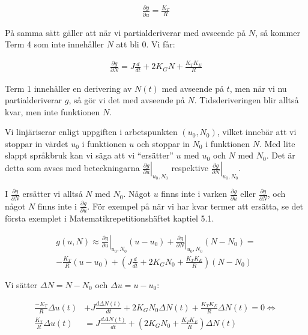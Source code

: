 \documentclass[a4paper]{article}
\begin{document}
\begin{align*}
  \frac{\partial g}{\partial u} = \frac{K_T}{R}
\end{align*}

På samma sätt gäller att när vi partialderiverar med avseende på $N$, så kommer Term 4 som inte innehåller $N$ att bli 0. Vi får:

\begin{align*}
  \frac{\partial g}{\partial N} = J\frac{d}{dt} + 2K_G N + \frac{K_T K_E}{R}
\end{align*}

Term 1 innehåller en derivering av $N(t)$ med avseende på $t$, men när vi nu partialderiverar $g$, så gör vi det med avseende på $N$. Tidsderiveringen blir alltså kvar, men inte funktionen $N$.

Vi linjäriserar enligt uppgiften i arbetspunkten $(u_0, N_0)$, vilket innebär att vi stoppar in värdet $u_0$ i funktionen $u$ och stoppar in $N_0$ i funktionen $N$. Med lite slappt språkbruk kan vi säga att vi ``ersätter'' $u$ med $u_0$ och $N$ med $N_0$. Det är detta som avses med beteckningarna $\left. \frac{\partial g}{\partial u} \right|_{u_0, N_0}$ respektive $\left. \frac{\partial g}{\partial N} \right|_{u_0, N_0}$.

I $\frac{\partial g}{\partial N}$ ersätter vi alltså $N$ med $N_0$. Något $u$ finns inte i varken $\frac{\partial g}{\partial u}$ eller $\frac{\partial g}{\partial N}$, och något $N$ finns inte i $\frac{\partial g}{\partial u}$. För exempel på när vi har kvar termer att ersätta, se det första exemplet i Matematikrepetitionshäftet kaptiel 5.1.

\begin{align*}
  g(u, N) \approx \left. \frac{\partial g}{\partial u}\right|_{u_0, N_0}(u - u_0) + \left. \frac{\partial g}{\partial N}\right|_{u_0, N_0}(N - N_0) = \\
  -\frac{K_T}{R}(u - u_0) + \left(J\frac{d}{dt} + 2K_G N_0 + \frac{K_T K_E}{R} \right)(N - N_0)
\end{align*}

Vi sätter $\Delta N = N - N_0$ och $\Delta u = u - u_0$:

\begin{align*}
  \frac{-K_T}{R}\Delta u(t) &+ J\frac{d\Delta N(t)}{dt} + 2K_G N_0\Delta N(t) + \frac{K_T K_E}{R} \Delta N(t) = 0 \Longleftrightarrow\\
  \frac{K_T}{R}\Delta u(t) &= J\frac{d\Delta N(t)}{dt} + \left(2K_G N_0 + \frac{K_T K_E}{R} \right) \Delta N(t)
\end{align*}
\end{document}
